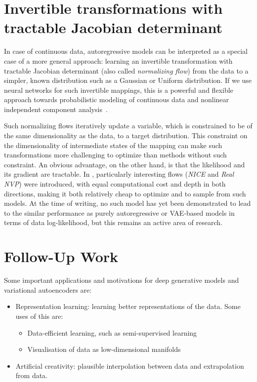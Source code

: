 \documentclass[MAL,biber]{nowfnt} %
\begin{document}
\section{Invertible transformations with tractable Jacobian determinant}
\label{sec:invtrans}
In case of continuous data, autoregressive models can be interpreted as a special case of a more general approach: learning an invertible transformation with tractable Jacobian determinant (also called \emph{normalizing flow}) from the data to a simpler, known distribution such as a Gaussian or Uniform distribution.  If we use neural networks for such invertible mappings, this is a powerful and flexible approach towards probabilistic modeling of continuous data and nonlinear independent component analysis~\citep{deco1995higher}.

Such normalizing flows iteratively update a variable, which is constrained to be of the same dimensionality as the data, to a target distribution. This constraint on the dimensionality of intermediate states of the mapping can make such transformations more challenging to optimize than methods without such constraint. An obvious advantage, on the other hand, is that the likelihood and its gradient are tractable. In \citep{dinh2014nice,dinh2016density}, particularly interesting flows (\emph{NICE} and \emph{Real NVP}) were introduced, with equal computational cost and depth in both directions, making it both relatively cheap to optimize and to sample from such models. At the time of writing, no such model has yet been demonstrated to lead to the similar performance as purely autoregressive or VAE-based models in terms of data log-likelihood, but this remains an active area of research.

\section{Follow-Up Work}
\label{sec:applications}

Some important applications and motivations for deep generative models and variational autoencoders are:
\begin{itemize}
	\item Representation learning: learning better representations of the data. Some uses of this are:
	\begin{itemize}
		\item Data-efficient learning, such as semi-supervised learning
		\item Visualisation of data as low-dimensional manifolds
	\end{itemize}
	\item Artificial creativity: plausible interpolation between data and extrapolation from data.
\end{itemize}  
\end{document}
